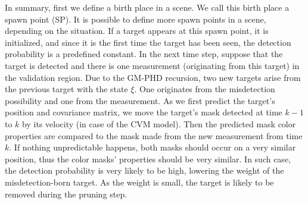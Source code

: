 In summary, first we define a birth place in a scene. We call this birth place a spawn point (SP). It is possible to
define more spawn points in a scene, depending on the situation. If a target appears at this spawn point, it is
initialized, and since it is the first time the target has been seen, the detection probability is a predefined
constant. In the
next time step, suppose that the target is detected and there is one measurement (originating from this target) in the
validation region. Due to the GM-PHD recursion, two new targets arise from the previous target with the state $\xi$.
One originates from
the misdetection possibility and one from the measurement. As
we first predict the target's position and covariance
matrix, we move the target's mask detected at time $k-1$ to $k$ by its velocity (in case of the CVM model). Then the
predicted mask color properties are compared to the mask made from the new measurement from time $k$. If nothing
unpredictable happens, both masks should occur on a very similar position, thus the color masks' properties should be
very similar. In such case, the detection probability is very likely to be high, lowering the weight of the
misdetection-born target. As the weight is small, the target is likely to be removed during the pruning step.

